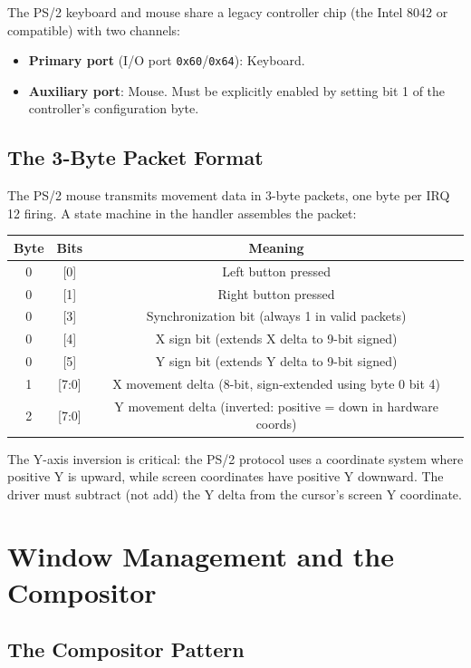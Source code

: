 \documentclass[12pt,a4paper]{report}
\begin{document}
The PS/2 keyboard and mouse share a legacy controller chip (the Intel 8042 or
compatible) with two channels:
\begin{itemize}
    \item \textbf{Primary port} (I/O port \texttt{0x60}/\texttt{0x64}): Keyboard.
    \item \textbf{Auxiliary port}: Mouse. Must be explicitly enabled by setting bit 1
    of the controller's configuration byte.
\end{itemize}

\subsection{The 3-Byte Packet Format}

The PS/2 mouse transmits movement data in 3-byte packets, one byte per IRQ 12 firing.
A state machine in the handler assembles the packet:

\begin{center}
\begin{tabular}{|c|c|c|}
\hline
\textbf{Byte} & \textbf{Bits} & \textbf{Meaning} \\
\hline
0 & [0] & Left button pressed \\
0 & [1] & Right button pressed \\
0 & [3] & Synchronization bit (always 1 in valid packets) \\
0 & [4] & X sign bit (extends X delta to 9-bit signed) \\
0 & [5] & Y sign bit (extends Y delta to 9-bit signed) \\
1 & [7:0] & X movement delta (8-bit, sign-extended using byte 0 bit 4) \\
2 & [7:0] & Y movement delta (inverted: positive = down in hardware coords) \\
\hline
\end{tabular}
\end{center}

The Y-axis inversion is critical: the PS/2 protocol uses a coordinate system where
positive Y is upward, while screen coordinates have positive Y downward. The driver
must subtract (not add) the Y delta from the cursor's screen Y coordinate.

\section{Window Management and the Compositor}

\subsection{The Compositor Pattern}
\end{document}

